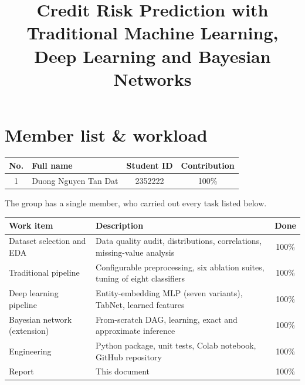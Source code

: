 \documentclass[twoside,final]{hcmut-report}
\title{Credit Risk Prediction with Traditional Machine Learning, Deep Learning and Bayesian Networks}
\begin{document}
\coverpage%

\section*{Member list \& workload}
\begin{center}
  \begin{tabular}{clcc}
    \toprule
    \textbf{No.} & \textbf{Full name} & \textbf{Student ID} & \textbf{Contribution} \\
    \midrule
    1 & Duong Nguyen Tan Dat & 2352222 & 100\% \\
    \bottomrule
  \end{tabular}
\end{center}

\noindent The group has a single member, who carried out every task listed below.

\begin{center}
  \small
  \begin{tabularx}{\linewidth}{l>{\raggedright\arraybackslash}Xc}
    \toprule
    \textbf{Work item} & \textbf{Description} & \textbf{Done} \\
    \midrule
    Dataset selection and EDA & Data quality audit, distributions, correlations, missing-value analysis & 100\% \\
    Traditional pipeline & Configurable preprocessing, six ablation suites, tuning of eight classifiers & 100\% \\
    Deep learning pipeline & Entity-embedding MLP (seven variants), TabNet, learned features & 100\% \\
    Bayesian network (extension) & From-scratch DAG, learning, exact and approximate inference & 100\% \\
    Engineering & Python package, unit tests, Colab notebook, GitHub repository & 100\% \\
    Report & This document & 100\% \\
    \bottomrule
  \end{tabularx}
\end{center}
\clearpage

\begin{abstract}
  
\end{abstract}
\clearpage

\tableofcontents
\listoffigures
\listoftables
\listofalgorithms
\clearpage








\clearpage



\clearpage
\appendix

\end{document}
